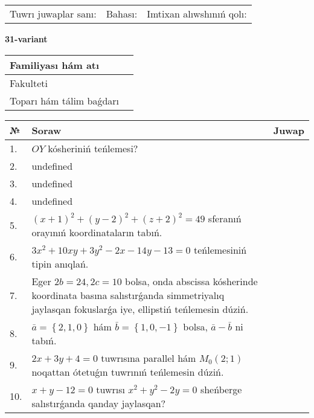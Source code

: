 \documentclass{article}
\begin{document}
\vspace{0.7cm}

\begin{tabular}{lll}
Tuwrı juwaplar sanı: \underline{\hspace{1cm}} & 
Bahası: \underline{\hspace{1cm}} & 
Imtixan alıwshınıń qolı: \underline{\hspace{2cm}} \\
\end{tabular}

\egroup

\newpage


\textbf{31-variant}\\

\bgroup
\def\arraystretch{1.6} %

\begin{tabular}{|m{5.7cm}|m{9.5cm}|}
\hline
Familiyası hám atı & \\
\hline
Fakulteti  & \\
\hline
Toparı hám tálim baǵdarı  & \\
\hline
\end{tabular}

\vspace{0.7cm}

\begin{tabular}{|m{0.7cm}|m{10cm}|m{4cm}|}
\hline
№ & Soraw & Juwap \\
\hline
1. & \(OY\) kósheriniń teńlemesi? &  \\
\hline
2. & undefined &  \\
\hline
3. & undefined &  \\
\hline
4. & undefined &  \\
\hline
5. & \((x + 1) ^{2} + (y - 2) ^{2} + (z + 2) ^{2} = 49\) sferanıń orayınıń koordinataların tabıń. &  \\
\hline
6. & \(3 x^{2} + 10 xy + 3 y^{2} - 2 x - 14 y - 13 = 0\) teńlemesiniń tipin anıqlań. &  \\
\hline
7. & Eger \(2 b = 24, 2 c = 10\) bolsa, onda abscissa kósherinde koordinata basına salıstırǵanda simmetriyalıq jaylasqan fokuslarǵa iye, ellipstiń teńlemesin dúziń. &  \\
\hline
8. & \(\bar{a} = \left\{ 2, 1, 0 \right\}\) hám \(\bar{b} = \left\{ 1, 0,- 1 \right\}\) bolsa, \(\bar{a} - \bar{b}\) ni tabıń. &  \\
\hline
9. & \(2 x + 3 y + 4 = 0\) tuwrısına parallel hám \(M_{0} (2;1)\) noqattan ótetuǵın tuwrınıń teńlemesin dúziń. &  \\
\hline
10. & \(x + y - 12 = 0\) tuwrısı \(x^{2} + y^{2} - 2 y = 0\) sheńberge salıstırǵanda qanday jaylasqan? & \\
\hline
\end{tabular}
\end{document}
